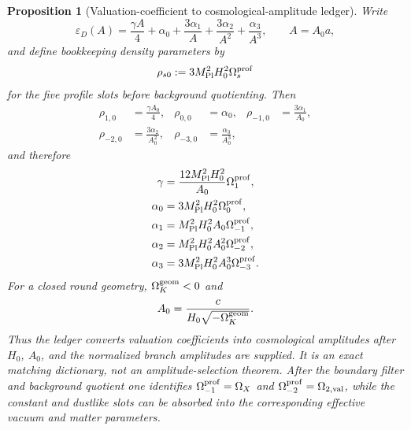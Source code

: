 \documentclass[11pt,a4paper]{article}
\numberwithin{equation}{section}
\theoremstyle{definition}
\theoremstyle{plain}
\newtheorem{proposition}[criterion]{Proposition}
\theoremstyle{remark}
\newcommand{\epsD}{\varepsilon_D}
\begin{document}
\begin{proposition}[Valuation-coefficient to cosmological-amplitude ledger]
\label{prop:valuation-amplitude-ledger}
Write
\begin{equation}
\epsD(A)=\frac{\gamma A}{4}+\alpha_0+
\frac{3\alpha_1}{A}+\frac{3\alpha_2}{A^2}+\frac{\alpha_3}{A^3},
\qquad A=A_0a,
\end{equation}
and define bookkeeping density parameters by
\begin{equation}
\rho_{s0}:=3M_{\rm Pl}^2H_0^2\Omega_s^{\rm prof}
\end{equation}
for the five profile slots before background quotienting.  Then
\begin{align}
\rho_{1,0}&=\frac{\gamma A_0}{4}, &
\rho_{0,0}&=\alpha_0, &
\rho_{-1,0}&=\frac{3\alpha_1}{A_0},\\
\rho_{-2,0}&=\frac{3\alpha_2}{A_0^2}, &
\rho_{-3,0}&=\frac{\alpha_3}{A_0^3},
\end{align}
and therefore
\begin{align}
\gamma&=\frac{12M_{\rm Pl}^2H_0^2}{A_0}\Omega_1^{\rm prof},\\
\alpha_0&=3M_{\rm Pl}^2H_0^2\Omega_0^{\rm prof},\\
\alpha_1&=M_{\rm Pl}^2H_0^2A_0\Omega_{-1}^{\rm prof},\\
\alpha_2&=M_{\rm Pl}^2H_0^2A_0^2\Omega_{-2}^{\rm prof},\\
\alpha_3&=3M_{\rm Pl}^2H_0^2A_0^3\Omega_{-3}^{\rm prof}.
\end{align}
For a closed round geometry, \(\Omega_K^{\rm geom}<0\) and
\begin{equation}
A_0=\frac{c}{H_0\sqrt{-\Omega_K^{\rm geom}}}.
\end{equation}
Thus the ledger converts valuation coefficients into cosmological amplitudes
after \(H_0\), \(A_0\), and the normalized branch amplitudes are supplied.  It
is an exact matching dictionary, not an amplitude-selection theorem.  After the
boundary filter and background quotient one identifies
\(\Omega_{-1}^{\rm prof}=\Omega_X\) and
\(\Omega_{-2}^{\rm prof}=\Omega_{2,{\rm val}}\), while the constant and dustlike
slots can be absorbed into the corresponding effective vacuum and matter
parameters.
\end{proposition}
\end{document}
